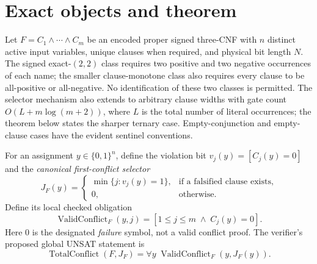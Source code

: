 \documentclass[11pt]{article}
\begin{document}
\section{Exact objects and theorem}
Let $F=C_1\wedge\cdots\wedge C_m$ be an encoded proper signed three-CNF with $n$ distinct active input variables, unique clauses when required, and physical bit length $N$. The signed exact-$(2,2)$ class requires two positive and two negative occurrences of each name; the smaller clause-monotone class also requires every clause to be all-positive or all-negative. No identification of these two classes is permitted. The selector mechanism also extends to arbitrary clause widths with gate count $O(L+m\log(m+2))$, where $L$ is the total number of literal occurrences; the theorem below states the sharper ternary case. Empty-conjunction and empty-clause cases have the evident sentinel conventions.

For an assignment $y\in\{0,1\}^n$, define the violation bit $v_j(y)=[C_j(y)=0]$ and the \emph{canonical first-conflict selector}
\[
J_F(y)=\begin{cases}
\min\{j: v_j(y)=1\},&\text{if a falsified clause exists},\\
0,&\text{otherwise}.
\end{cases}\tag{1}
\]
Define its local checked obligation
\[
\operatorname{ValidConflict}_F(y,j)=[1\le j\le m\;\wedge\;C_j(y)=0].\tag{2}
\]
Here $0$ is the designated \emph{failure} symbol, not a valid conflict proof. The verifier's proposed global UNSAT statement is
\[
\operatorname{TotalConflict}(F,J_F)
=\forall y\;\operatorname{ValidConflict}_F(y,J_F(y)).\tag{3}
\]
\end{document}
